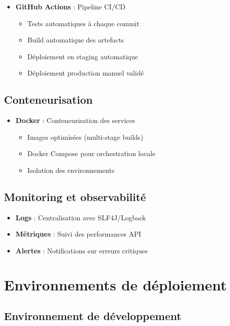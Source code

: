 \documentclass[a4paper,11pt]{report}
\begin{document}
\begin{itemize}
    \item \textbf{GitHub Actions} : Pipeline CI/CD
    \begin{itemize}
        \item Tests automatiques à chaque commit
        \item Build automatique des artefacts
        \item Déploiement en staging automatique
        \item Déploiement production manuel validé
    \end{itemize}
\end{itemize}

\subsection{Conteneurisation}

\begin{itemize}
    \item \textbf{Docker} : Conteneurisation des services
    \begin{itemize}
        \item Images optimisées (multi-stage builds)
        \item Docker Compose pour orchestration locale
        \item Isolation des environnements
    \end{itemize}
\end{itemize}

\subsection{Monitoring et observabilité}

\begin{itemize}
    \item \textbf{Logs} : Centralisation avec SLF4J/Logback
    \item \textbf{Métriques} : Suivi des performances API
    \item \textbf{Alertes} : Notifications sur erreurs critiques
\end{itemize}

\section{Environnements de déploiement}

\subsection{Environnement de développement}
\end{document}
